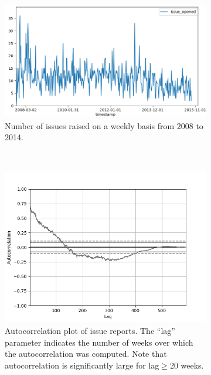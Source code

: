 \begin{figure}
	\centering
	\begin{subfigure}[t]{0.5\textwidth}
		\centering
		\includegraphics[width=\linewidth]{images/sample/sample_raw.png}
		\caption{Number of issues raised on a weekly basis from 2008 to 2014.}
		\label{fig:sample_raw}
	\end{subfigure}%
	~
	\begin{subfigure}[t]{0.415\textwidth}
		\centering
		\includegraphics[width=\linewidth]{images/sample/sample_autocorr.png}
		\caption{Autocorrelation plot of issue reports. The ``lag'' parameter indicates the number of weeks over which the autocorrelation was computed. Note that autocorrelation is significantly large for lag$\geq$20 weeks.}
		\label{fig:sample_autocorr}	
	\end{subfigure}%
	\\
	\begin{subfigure}[t]{0.57\textwidth}

\end{subfigure}
\end{figure}

